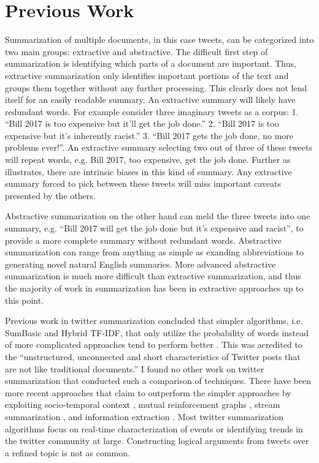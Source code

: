 \documentclass[paper=letter, fontsize=12pt]{article}
\begin{document}
\section{Previous Work}
Summarization of multiple documents, in this case tweets, can be categorized into two main groups: extractive and abstractive. The difficult first step of summarization is identifying which parts of a document are important. Thus, extractive summarization only identifies important portions of the text and groups them together without any further processing. This clearly does not lend itself for an easily readable summary. An extractive summary will likely have redundant words. For example consider three imaginary tweets as a corpus: 1. ``Bill 2017 is too expensive but it'll get the job done.'' 2. ``Bill 2017 is too expensive but it's inherently racist.'' 3. ``Bill 2017 gets the job done, no more problems ever!''. An extractive summary selecting two out of three of these tweets will repeat words, e.g. Bill 2017, too expensive, get the job done. Further as \cite{Ganesan2010} illustrates, there are intrinsic biases in this kind of summary. Any extractive summary forced to pick between these tweets will miss important caveats presented by the others.

Abstractive summarization on the other hand can meld the three tweets into one summary, e.g. ``Bill 2017 will get the job done but it's expensive and racist'', to provide a more complete summary without redundant words. Abstractive summarization can range from anything as simple as exanding abbreviations to generating novel natural English summaries. More advanced abstractive summarization is much more difficult than extractive summarization, and thus the majority of work in summarization has been in extractive approaches up to this point.

Previous work in twitter summarization concluded that simpler algorithms, i.e. SumBasic and Hybrid TF-IDF, that only utilize the probability of words instead of more complicated approaches tend to perform better \cite{Inouye2011}. This was acredited to the ``unstructured, unconnected and short characteristics of Twitter posts that are not like traditional documents.'' I found no other work on twitter summarization that conducted such a comparison of techniques. There have been more recent approaches that claim to outperform the simpler approaches by exploiting socio-temporal context \cite{He2016}, mutual reinforcement graphs \cite{Duan2012}, stream summarization \cite{Yang2012}, and information extraction \cite{Xu2013}. Most twitter summarization algorithms focus on real-time characterization of events or identifying trends in the twitter community at large. Constructing logical arguments from tweets over a refined topic is not as common. 
\end{document}
